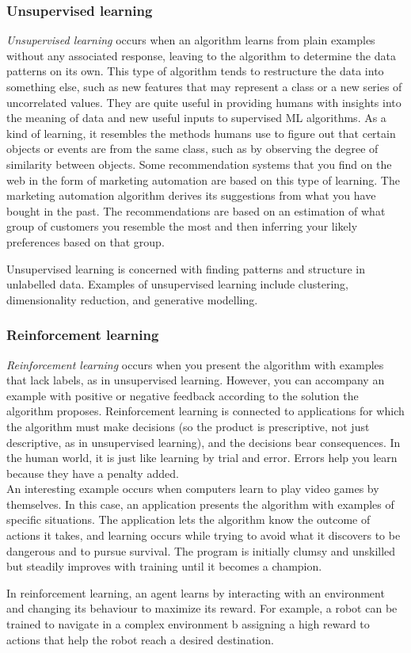 \subsubsection{Unsupervised learning}
\emph{Unsupervised learning} occurs when an algorithm learns from plain examples without any associated response, leaving to the algorithm to determine the data patterns on its own. This type of algorithm tends to restructure the data into something else, such as new features that may represent a class or a new series of uncorrelated values. They are quite useful in providing humans with insights into the meaning of data and new useful inputs to supervised ML algorithms. As a kind of learning, it resembles the methods humans use to figure out that certain objects or events are from the same class, such as by observing the degree of similarity between objects. Some recommendation systems that you find on the web in the form of marketing automation are based on this type of learning. The marketing automation algorithm derives its suggestions from what you have bought in the past. The recommendations are based on an estimation of what group of customers you resemble the most and then inferring your likely preferences based on that group.
\begin{definition}
	Unsupervised learning is concerned with finding patterns and structure in unlabelled data. Examples of unsupervised learning include clustering, dimensionality reduction, and generative modelling.
\end{definition}

\subsubsection{Reinforcement learning}
\emph{Reinforcement learning}
occurs when you present the algorithm with examples that lack labels, as in unsupervised learning. However, you can accompany an example with positive or negative feedback according to the solution the algorithm proposes. Reinforcement learning is connected to applications for which the algorithm must make decisions (so the product is prescriptive, not just descriptive, as in unsupervised learning), and the decisions bear consequences. In the human world, it is just like learning by trial and error. Errors help you learn because they have a penalty added.\\
An interesting example occurs when computers learn to play video games by themselves. In this case, an application presents the algorithm with examples of specific situations. The application lets the algorithm know the outcome of actions it takes, and learning occurs while trying to avoid what it discovers to be dangerous and to pursue survival. The program is initially clumsy and unskilled but steadily improves with training until it becomes a champion.
\begin{definition}
	In reinforcement learning, an agent learns by interacting with an environment and changing its behaviour to maximize its reward. For example, a robot can be trained to navigate in a complex environment b assigning a high reward to actions that help the robot reach a desired destination.
\end{definition}
